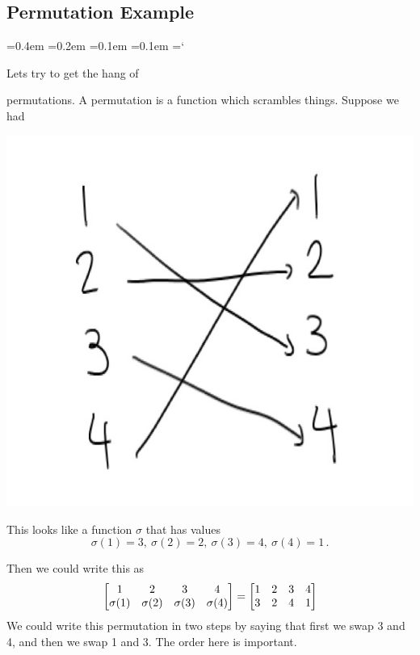 
\subsection*{Permutation Example}

{\ttfamily
{}\font=0.4em
\font=0.2em
\font=0.1em
\font=0.1em
\hyphenchar\font=`\-


\hypertarget{scripts_elementary_matrices_permutations}{Lets try to get the hang of }permutations. A permutation is a function which scrambles things. Suppose we had

\begin{center}
\includegraphics[alt={The permutation that takes 1 to 3, 2 to 2, 3 to 4, and 4 to 1.},scale=.35]{permutation_1.jpg}
\end{center}

 This looks like a function $\sigma$ that has values
 \[ \sigma(1) =3 ,\  \sigma(2) =2 ,\ \sigma(3) =4 ,\ \sigma(4) = 1\, .\]
 
 Then we could write this as
\[
\begin{bmatrix}
\mc1 & \mc2 & \mc3 & \mc4\\
\sigma(1) & \sigma(2) & \sigma(3) & \sigma(4)
\end{bmatrix}
= \begin{bmatrix}
1 & 2 & 3 & 4 \\
3 & 2 & 4 & 1 
\end{bmatrix}
\]
We could write this permutation in two steps by saying that first we swap 3 and 4, and then we swap 1 and 3. The order here is important.

}
